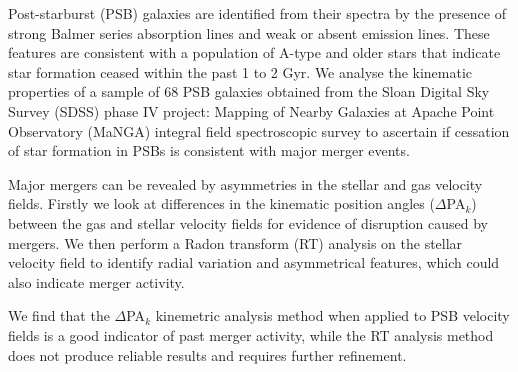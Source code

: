 
Post-starburst (PSB) galaxies are identified from their spectra by the presence of strong Balmer series absorption lines and weak or absent emission lines. These features are consistent with a population of A-type and older stars that indicate star formation ceased within the past 1 to 2 Gyr. We analyse the kinematic properties of a sample of 68 PSB galaxies obtained from the Sloan Digital Sky Survey (SDSS) phase IV project: Mapping of Nearby Galaxies at Apache Point Observatory (MaNGA) integral field spectroscopic survey to ascertain if cessation of star formation in PSBs is consistent with major merger events. 

Major mergers can be revealed by asymmetries in the stellar and gas velocity fields. Firstly we look at differences in the kinematic position angles ($\Delta$PA$_{k}$) between the gas and stellar velocity fields for evidence of disruption caused by mergers. We then perform a Radon transform (RT) analysis on the stellar velocity field to identify radial variation and asymmetrical features, which could also indicate merger activity. 

We find that the $\Delta$PA$_{k}$ kinemetric analysis method when applied to PSB velocity fields is a good indicator of past merger activity, while the RT analysis method does not produce reliable results and requires further refinement. 